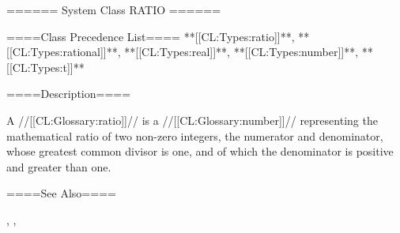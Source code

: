 ====== System Class RATIO ======

====Class Precedence List==== **[[CL:Types:ratio]]**, **[[CL:Types:rational]]**, **[[CL:Types:real]]**, **[[CL:Types:number]]**, **[[CL:Types:t]]**

====Description====

A //[[CL:Glossary:ratio]]// is a //[[CL:Glossary:number]]// representing the mathematical ratio of two non-zero integers, the numerator and denominator, whose greatest common divisor is one, and of which the denominator is positive and greater than one.

====See Also====

{\figref\SyntaxForNumericTokens}, {\secref\NumsFromTokens}, {\secref\PrintingRatios}

